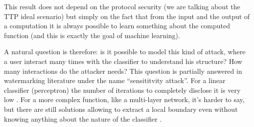 \documentclass[11pt,oribibl,runningheads]{llncs}
\begin{document}
This result does not depend on the protocol security (we are
talking about the TTP ideal scenario) but simply on the fact that
from the input and the output of a computation it is always
possible to learn something about the computed function (and this
is exactly the goal of machine learning).

A natural question is therefore: is it possible to model this kind of attack, where a user interact many times with the classifier to understand his structure? How many interactions do the attacker needs? This question is partially answered in watermarking literature under the name ``sensititvity attack''.
For a linear classifier (perceptron) the number of
iterations to completely disclose it is very low
\cite{Cox97,Kalk98}. For a more complex function, like a
multi-layer network, it's harder to say, but there are still
solutions allowing to extract a local boundary even without
knowing anything about the nature of the classifier
\cite{comesana2006bns}.
\end{document}

